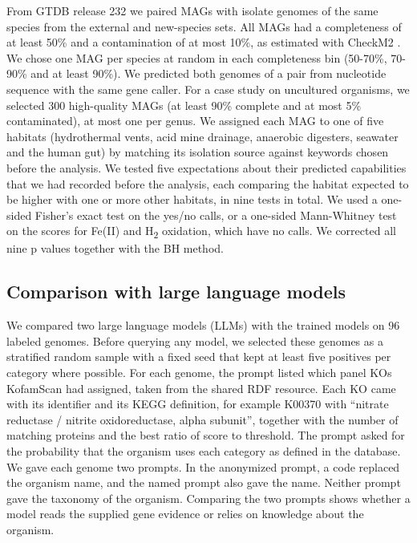 \documentclass[10pt,a4paper,onecolumn]{article}
\begin{document}
From GTDB release 232 \autocite{Parks2022} we paired MAGs with isolate
genomes of the same species from the external and new-species sets. All
MAGs had a completeness of at least 50\% and a contamination of at most
10\%, as estimated with CheckM2 \autocite{Chklovski2023}. We chose one
MAG per species at random in each completeness bin (50-70\%, 70-90\% and
at least 90\%). We predicted both genomes of a pair from nucleotide
sequence with the same gene caller. For a case study on uncultured
organisms, we selected 300 high-quality MAGs (at least 90\% complete and
at most 5\% contaminated), at most one per genus. We assigned each MAG
to one of five habitats (hydrothermal vents, acid mine drainage,
anaerobic digesters, seawater and the human gut) by matching its
isolation source against keywords chosen before the analysis. We tested
five expectations about their predicted capabilities that we had
recorded before the analysis, each comparing the habitat expected to be
higher with one or more other habitats, in nine tests in total. We used
a one-sided Fisher's exact test on the yes/no calls, or a one-sided
Mann-Whitney test on the scores for Fe(II) and H\textsubscript{2}
oxidation, which have no calls. We corrected all nine p values together
with the BH method.

\subsection{Comparison with large language
models}\label{comparison-with-large-language-models}

We compared two large language models (LLMs) with the trained models on
96 labeled genomes. Before querying any model, we selected these genomes
as a stratified random sample with a fixed seed that kept at least five
positives per category where possible. For each genome, the prompt
listed which panel KOs KofamScan had assigned, taken from the shared RDF
resource. Each KO came with its identifier and its KEGG definition, for
example K00370 with ``nitrate reductase / nitrite oxidoreductase, alpha
subunit'', together with the number of matching proteins and the best
ratio of score to threshold. The prompt asked for the probability that
the organism uses each category as defined in the database. We gave each
genome two prompts. In the anonymized prompt, a code replaced the
organism name, and the named prompt also gave the name. Neither prompt
gave the taxonomy of the organism. Comparing the two prompts shows
whether a model reads the supplied gene evidence or relies on knowledge
about the organism.
\end{document}

